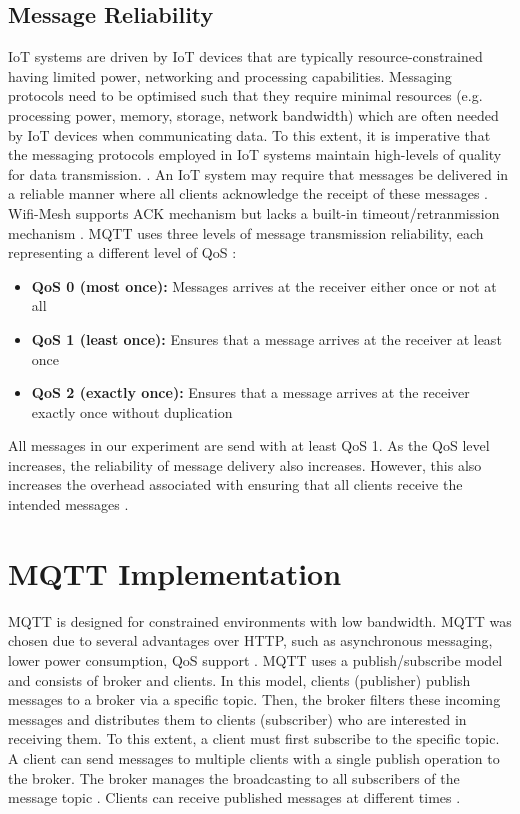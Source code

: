 \subsection{Message Reliability}
\ac{IoT} systems are driven by \ac{IoT} devices that are typically resource-constrained having limited power, networking and processing capabilities. Messaging protocols need to be optimised such that they require minimal resources (e.g. processing power, memory, storage, network bandwidth) which are often needed by IoT devices when communicating data. To this extent, it is imperative that the messaging protocols employed in IoT systems maintain high-levels of quality for data transmission. \cite[15]{protocols}. An IoT system may require that messages be delivered in a reliable manner where all clients acknowledge the receipt of these messages \cite[11]{protocols}.
Wifi-Mesh supports ACK mechanism but lacks a built-in timeout/retranmission mechanism \cite[51]{esp-faq}. \ac{MQTT} uses three levels of message transmission reliability, each representing a different level of \ac{QoS} \cite[12]{serialisation}:
\begin{itemize}
    \item \textbf{\ac{QoS} 0 (most once):} Messages arrives at the receiver either once or not at all \cite[11]{serialisation}
    \item \textbf{\ac{QoS} 1 (least once):} Ensures that a message arrives at the receiver at least once \cite[11]{serialisation}
    \item \textbf{\ac{QoS} 2 (exactly once):} Ensures that a message arrives at the receiver exactly once without duplication \cite[11]{serialisation}
\end{itemize}

All messages in our experiment are send with at least \ac{QoS} 1. As the \ac{QoS} level increases, the reliability of message delivery also increases. However, this also increases the overhead associated with ensuring that all clients receive the intended messages \cite[11]{protocols}.

\section{\ac{MQTT} Implementation}  \label{sec:mqtt-impl}
\ac{MQTT} is designed for constrained environments with low bandwidth. \ac{MQTT} was chosen due to several advantages over \ac{HTTP}, such as asynchronous messaging, lower power consumption, \ac{QoS} support \cite[23, 27]{protocols}. \ac{MQTT} uses a publish/subscribe model and consists of broker and clients. In this model, clients (publisher) publish messages to a broker via a specific topic. Then, the broker filters these incoming messages and distributes them to clients (subscriber) who are interested in receiving them. To this extent, a client must first subscribe to the specific topic. A client can send messages to multiple clients with a single publish operation to the broker. The broker manages the broadcasting to all subscribers of the message topic \cite[10]{protocols} \cite[12]{serialisation}. Clients can receive published messages at different times \cite[19,21,22]{protocols}. 

